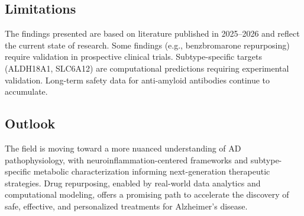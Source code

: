 \documentclass[11pt, a4paper]{article}
\begin{document}
\subsection{Limitations}
The findings presented are based on literature published in 2025--2026 and reflect the current state of research. Some findings (e.g., benzbromarone repurposing) require validation in prospective clinical trials. Subtype-specific targets (ALDH18A1, SLC6A12) are computational predictions requiring experimental validation. Long-term safety data for anti-amyloid antibodies continue to accumulate.

\subsection{Outlook}
The field is moving toward a more nuanced understanding of AD pathophysiology, with neuroinflammation-centered frameworks and subtype-specific metabolic characterization informing next-generation therapeutic strategies. Drug repurposing, enabled by real-world data analytics and computational modeling, offers a promising path to accelerate the discovery of safe, effective, and personalized treatments for Alzheimer's disease.
\end{document}
